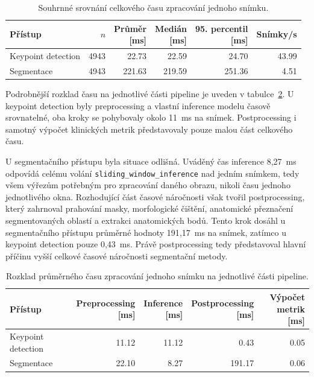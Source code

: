 \documentclass[male,czech,api_bc]{kitheses}
\begin{document}
\begin{table}[htbp]
\centering
\caption{Souhrnné srovnání celkového času zpracování jednoho snímku.}
\label{tab:runtime_total}
\begin{tabular}{lrrrrr}
\hline
Přístup & $n$ & \shortstack{Průměr\\{[ms]}} & \shortstack{Medián\\{[ms]}} & \shortstack{95. percentil\\{[ms]}} & Snímky/s \\
\hline
Keypoint detection & 4943 & 22.73 & 22.59 & 24.70 & 43.99 \\
Segmentace & 4943 & 221.63 & 219.59 & 251.36 & 4.51 \\
\hline
\end{tabular}
\end{table}

Podrobnější rozklad času na jednotlivé části pipeline je uveden v tabulce~\ref{tab:runtime_breakdown}. U keypoint detection byly preprocessing a vlastní inference modelu časově srovnatelné, oba kroky se pohybovaly okolo 11~ms na snímek. Postprocessing i samotný výpočet klinických metrik představovaly pouze malou část celkového času.

U segmentačního přístupu byla situace odlišná. Uváděný čas inference 8{,}27~ms odpovídá celému volání \texttt{sliding\_window\_inference} nad jedním snímkem, tedy všem výřezům potřebným pro zpracování daného obrazu, nikoli času jednoho jednotlivého okna. Rozhodující část časové náročnosti však tvořil postprocessing, který zahrnoval prahování masky, morfologické čištění, anatomické přeznačení segmentovaných oblastí a extrakci anatomických bodů. Tento krok dosáhl u segmentačního přístupu průměrné hodnoty 191{,}17~ms na snímek, zatímco u keypoint detection pouze 0{,}43~ms. Právě postprocessing tedy představoval hlavní příčinu vyšší celkové časové náročnosti segmentační metody.

\begin{table}[htbp]
\centering
\caption{Rozklad průměrného času zpracování jednoho snímku na jednotlivé části pipeline.}
\label{tab:runtime_breakdown}
\begin{tabular}{lrrrr}
\hline
Přístup & \shortstack{Preprocessing\\{[ms]}} & \shortstack{Inference\\{[ms]}} & \shortstack{Postprocessing\\{[ms]}} & \shortstack{Výpočet\\metrik {[ms]}} \\
\hline
Keypoint detection & 11.12 & 11.12 & 0.43 & 0.05 \\
Segmentace & 22.10 & 8.27 & 191.17 & 0.06 \\
\hline
\end{tabular}
\end{table}
\end{document}
